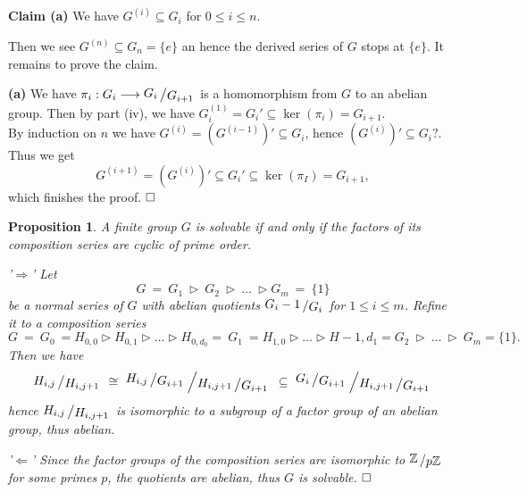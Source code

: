 \documentclass[11pt]{book}
\newtheorem{proposition}[theorem]{Proposition}
\theoremstyle{nonumberbreak}
\newenvironment{pr}[1][]{\ifthenelse{\equal{#1}{}}{\proof}{\proof[#1]}\rm}{\endproof}
\newenvironment{definbem}[1][]{\ifthenelse{\equal{#1}{}}{\definibem}{\definibem[#1]}\rm}{\enddefinibem}
\newcommand{\slant}[2]{{\raisebox{.1em}{$#1$}\left/\raisebox{-.1em}{$#2$}\right.}}
\newcommand{\bigslant}[2]{{\raisebox{.2em}{$#1$}\left/\raisebox{-.2em}{$#2$}\right.}}
\begin{document}
\begin{spacing}{1.3}
\begin{definbem}
\begin{pr}
\begin{compactenum}
\begin{compactitem}
\begin{compactenum}
\item[\textbf{Claim (a)}] We have $G^{(i)} \subseteq G_i$ for $0 \leqslant i \leqslant n$.
\end{compactenum}
Then we see $G^{(n)} \subseteq G_n = \{e\}$ an hence the derived series of $G$ stops at $\{e\}$. It remains to prove the claim.
\begin{compactenum}
\item[\textbf{(a)}] We have $\pi_i:G_i \longrightarrow \slant{G_i}{G_{i+1}}$ is a homomorphism from $G$ to an abelian group. Then by part (iv), we have $G_i^{(1)}=G_i' \subseteq \ker(\pi_i)=G_{i+1}$.\\
By induction on $n$ we have $G^{(i)}=(G^{(i-1)})' \subseteq G_i$, hence $\left(G^{(i)}\right)' \subseteq G_i?$.\\
Thus we get 
$$G^{(i+1)} = \left(G^{(i)}\right)' \subseteq G_i' \subseteq \ker(\pi_I) = G_{i+1},$$
which finishes the proof. $\hfill \Box$
\end{compactenum}
\end{compactitem}
\end{compactenum}
\end{pr}
\end{definbem}

\begin{proposition} %
A finite group $G$ is solvable if and only if the factors of its composition series are cyclic of prime order.
\begin{pr}
\begin{compactenum}
\item['$\Rightarrow$'] Let 
$$G \ = \ G_1 \ \triangleright \ G_2 \ \triangleright \ \ldots \ \triangleright G_m \ = \ \{1\}$$
be a normal series of $G$ with abelian quotients $\slant{G_i-1}{G_{i}}$ for $1 \leqslant i \leqslant m$. Refine it to a composition series
$$G \ = \ G_0 \ = H_{0,0} \triangleright H_{0,1}  \triangleright  \ldots  \triangleright H_{0,d_0}  =  \ G_1 \ = H_{1,0}  \triangleright \ldots  \triangleright  H-{1,d_1} = G_2 \ \triangleright \ \ldots \ \triangleright \ G_m = \{1\}.$$
Then we have
$$\slant{H_{i,j}}{H_{i,j+1}} \ \cong\ \bigslant{\slant{H_{i,j}}{G_{i+1}}}{\slant{H_{i,j+1}}{G_{i+1}}} \ \subseteq \ \bigslant{\slant{G_i}{G_{i+1}}}{\slant{H_{i,j+1}}{G_{i+1}}}$$
hence $\slant{H_{i,j}}{H_{i,j+1}}$ is isomorphic to a subgroup of a factor group of an abelian group, thus abelian.
\item['$\Leftarrow$'] Since the factor groups of the composition series are isomorphic to $\slant{\mathbb{Z}}{p \mathbb{Z}}$ for some primes $p$, the quotients are abelian, thus $G$ is solvable. $\hfill \Box$
\end{compactenum}
\end{pr}
\end{proposition}



\end{spacing}
\end{document}
